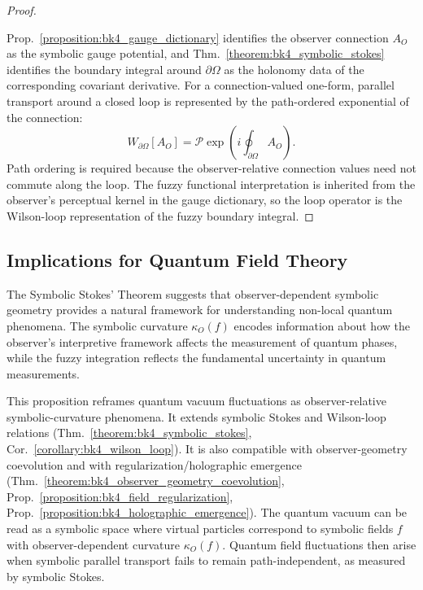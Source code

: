 \begin{proof}
\label{proof:bk4_wilson_loop}
\leavevmode

Prop.~\ref{proposition:bk4_gauge_dictionary} identifies the observer connection
$A_O$ as the symbolic gauge potential, and Thm.~\ref{theorem:bk4_symbolic_stokes}
identifies the boundary integral around $\partial\Omega$ as the holonomy data
of the corresponding covariant derivative. For a connection-valued one-form,
parallel transport around a closed loop is represented by the path-ordered
exponential of the connection:
\[
W_{\partial\Omega}[A_O]
 =
\mathcal P\exp\!\left(i\oint_{\partial\Omega}A_O\right).
\]
Path ordering is required because the observer-relative connection values need
not commute along the loop. The fuzzy functional interpretation is inherited
from the observer's perceptual kernel in the gauge dictionary, so the loop
operator is the Wilson-loop representation of the fuzzy boundary integral.
\end{proof}

\subsection{Implications for Quantum Field Theory}
\label{subsec:bk4_implications_for_quantum_field_theory}

The Symbolic Stokes' Theorem suggests that observer-dependent symbolic geometry provides a natural framework for understanding non-local quantum phenomena. The symbolic curvature $\kappa_O(f)$ encodes information about how the observer's interpretive framework affects the measurement of quantum phases, while the fuzzy integration reflects the fundamental uncertainty in quantum measurements.

\begin{proposition}
\label{proposition:bk4_quantum_geometry}
This proposition reframes quantum vacuum fluctuations as observer-relative
symbolic-curvature phenomena.
It extends symbolic Stokes and Wilson-loop relations
(Thm.~\ref{theorem:bk4_symbolic_stokes},
Cor.~\ref{corollary:bk4_wilson_loop}).
It is also compatible with observer-geometry coevolution and with
regularization/holographic emergence
(Thm.~\ref{theorem:bk4_observer_geometry_coevolution},
Prop.~\ref{proposition:bk4_field_regularization},
Prop.~\ref{proposition:bk4_holographic_emergence}).
The quantum vacuum can be read as a symbolic space where virtual particles
correspond to symbolic fields $f$ with observer-dependent curvature
$\kappa_O(f)$. Quantum field fluctuations then arise when symbolic parallel
transport fails to remain path-independent, as measured by symbolic Stokes.
\end{proposition}

